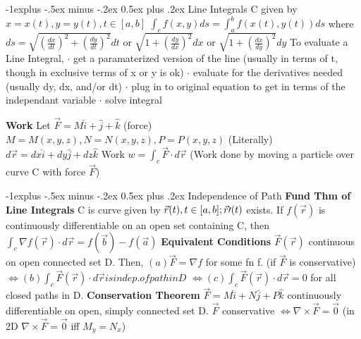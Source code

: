 \documentclass[10pt,landscape]{article}
\makeatletter
\renewcommand{\subsection}{\@startsection{subsection}{2}{0mm}%
                                {-1explus -.5ex minus -.2ex}%
                                {0.5ex plus .2ex}%
                                {\normalfont\normalsize\bfseries}}
\makeatother
\begin{document}
\begin{multicols*}{5}
\subsection{Line Integrals}
C given by $x = x(t), y = y(t), t\in [a,b]$\newline 
$ \int_cf(x,y)ds = \int_a^bf(x(t), y(t)) ds $\newline
where $ ds = \sqrt{(\frac{dx}{dt})^2+(\frac{dy}{dt})^2} dt $\newline
or $ \sqrt{1+(\frac{dy}{dx})^2} dx $\newline
or $ \sqrt{1+(\frac{dx}{dy})^2} dy $\newline
To evaluate a Line Integral,\newline
$\cdot$ get a paramaterized version of the line (usually in terms of t, though in exclusive terms of x or y is ok)\newline
$\cdot$ evaluate for the derivatives needed (usually dy, dx, and/or dt)\newline
$\cdot$ plug in to original equation to get in terms of the independant variable\newline
$\cdot$ solve integral\newline

\textbf{Work}\newline
Let $ \vec{F} = M\hat{i}+\hat{j}+\hat{k} $ (force) $ M=M(x,y,z), N=N(x,y,z), P=P(x,y,z) $\newline
(Literally)$ d\vec{r} = dx\hat{i}+dy\hat{j}+dz\hat{k} $\newline
Work $ w = \int_c\vec{F}\cdot d\vec{r} $\newline
(Work done by moving a particle over curve C with force $ \vec{F} $)

\subsection{Independence of Path}
\textbf{Fund Thm of Line Integrals}\newline
C is curve given by $ \vec{r}(t), t\in[a,b];\newline \vec{r}\prime(t) $ exists. If $ f(\vec{r}) $ is continuously differentiable on an open set containing C, then $ \int_c\nabla f(\vec{r}) \cdot d\vec{r} = f(\vec{b}) - f(\vec{a}) $\newline
\textbf{Equivalent Conditions}\newline
$ \vec{F}(\vec{r}) $ continuous on open connected set D. Then,\newline
$ (a) \vec{F} = \nabla f $ for some fn f. (if $ \vec{F} $ is conservative)
$ \Leftrightarrow (b) \int_c\vec{F}(\vec{r})\cdot d\vec{r} is indep. of path in D $\newline
$ \Leftrightarrow (c) \int_c\vec{F}(\vec{r})\cdot d\vec{r} = 0 $ for all closed paths in D.\newline
\textbf{Conservation Theorem}\newline
$ \vec{F} = M\hat{i}+N\hat{j}+P\hat{k} $ continuously differentiable on open, simply connected set D.\newline
$ \vec{F} $ conservative $ \Leftrightarrow \nabla\times\vec{F} = \vec{0} $ \newline
(in 2D $ \nabla\times\vec{F}=\vec{0} $ iff $ M_y = N_x$)


\end{multicols*}
\end{document}
